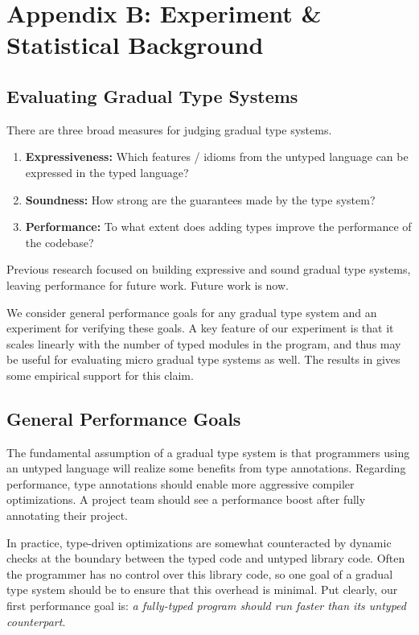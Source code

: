 \documentclass{article}
\begin{document}
\section{Appendix B: Experiment \& Statistical Background}
\subsection{Evaluating Gradual Type Systems}
There are three broad measures for judging gradual type systems.
\begin{enumerate}
\item \textbf{Expressiveness:} Which features / idioms from the untyped language can be expressed in the typed language?
\item \textbf{Soundness:} How strong are the guarantees made by the type system?
\item \textbf{Performance:} To what extent does adding types improve the performance of the codebase?
\end{enumerate}
Previous research focused on building expressive and sound gradual type systems, leaving performance for future work.
Future work is now.

We consider general performance goals for any gradual type system and an experiment for verifying these goals.
A key feature of our experiment is that it scales linearly with the number of typed modules in the program, and thus may be useful for evaluating micro gradual type systems as well.
The results in  gives some empirical support for this claim.


\subsection{General Performance Goals}
The fundamental assumption of a gradual type system is that programmers using an untyped language will realize some benefits from type annotations.
Regarding performance, type annotations should enable more aggressive compiler optimizations.
A project team should see a performance boost after fully annotating their project.

In practice, type-driven optimizations are somewhat counteracted by dynamic checks at the boundary between the typed code and untyped library code.
Often the programmer has no control over this library code, so one goal of a gradual type system should be to ensure that this overhead is minimal.
Put clearly, our first performance goal is: \emph{a fully-typed program should run faster than its untyped counterpart}.
\end{document}
